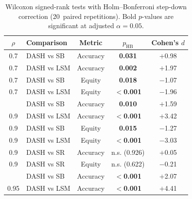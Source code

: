 \documentclass[11pt]{article}
\newcommand{\rhovar}{\rho}
\begin{document}
\begin{table}[htbp]
\centering
\caption{Wilcoxon signed-rank tests with Holm--Bonferroni step-down correction
(20~paired repetitions). Bold $p$-values are significant at adjusted
$\alpha = 0.05$.}
\label{tab:significance}
\small
\begin{tabular}{clccc}
\toprule
$\rhovar$ & \textbf{Comparison} & \textbf{Metric} & $p_{\text{HB}}$ & Cohen's $d$ \\
\midrule
0.7  & DASH vs SB  & Accuracy & \textbf{0.031} & $+$0.98 \\
0.7  & DASH vs LSM & Accuracy & \textbf{0.002} & $+$1.97 \\
0.7  & DASH vs SB  & Equity   & \textbf{0.018} & $-$1.07 \\
0.7  & DASH vs LSM & Equity   & \textbf{$<$0.001} & $-$1.96 \\
\addlinespace
0.9  & DASH vs SB  & Accuracy & \textbf{0.010} & $+$1.59 \\
0.9  & DASH vs LSM & Accuracy & \textbf{$<$0.001} & $+$3.42 \\
0.9  & DASH vs SB  & Equity   & \textbf{0.015} & $-$1.27 \\
0.9  & DASH vs LSM & Equity   & \textbf{$<$0.001} & $-$3.03 \\
0.9  & DASH vs SR  & Accuracy & n.s. (0.926) & $+$0.05 \\
0.9  & DASH vs SR  & Equity   & n.s. (0.622) & $-$0.21 \\
\addlinespace
0.95 & DASH vs SB  & Accuracy & \textbf{$<$0.001} & $+$2.07 \\
0.95 & DASH vs LSM & Accuracy & \textbf{$<$0.001} & $+$4.41 \\
\bottomrule
\end{tabular}
\end{table}
\end{document}
